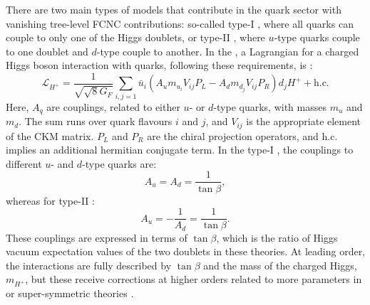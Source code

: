 There are two main types of \TwoHDM models that contribute in the quark sector with vanishing tree-level FCNC contributions:
so-called type-I \TwoHDM, where all quarks can couple to only one of the Higgs doublets, or
type-II \TwoHDM, where $u$-type quarks couple to one doublet and $d$-type couple to another.
In the \SM, a Lagrangian for a charged Higgs boson interaction with quarks, following these requirements, is \cite{Hermann:2012fc}:
\begin{equation}
    \mathcal{L}_{H^+} = \frac{1}{\sqrt{\sqrt8G_F}} \sum_{i,j=1} \bar{u}_i (A_u m_{u_i}V_{ij}P_L - A_d m_{d_j}V_{ij}P_R)d_jH^+ + \mathrm{h.c}.
\end{equation}
Here, $A_q$ are couplings, related to either $u$- or $d$-type quarks, with masses $m_u$ and $m_d$.
The sum runs over quark flavours $i$ and $j$, and $V_{ij}$ is the appropriate element of the CKM matrix.
$P_L$ and $P_R$ are the chiral projection operators, and h.c. implies an additional hermitian conjugate term. 
In the type-I \TwoHDM, the couplings to different $u$- and $d$-type quarks are:
\begin{equation}\label{eq:type1_hdm_couplings}
A_u = A_d = \frac{1}{\tan\beta},
\end{equation}
whereas for type-II \TwoHDM:
\begin{equation}\label{eq:type2_hdm_couplings}
    A_u = - \frac{1}{A_d} = \frac{1}{\tan\beta}.
\end{equation}
These couplings are expressed in terms of $\tan\beta$, which is the ratio of Higgs vacuum expectation values of the two doublets in these theories.
At leading order, the interactions are fully described by $\tan\beta$ and the mass of the charged Higgs, $m_{H^+}$, but these receive corrections at higher orders related to more parameters in \TwoHDM or super-symmetric theories \cite{Feng:1996xv}.

